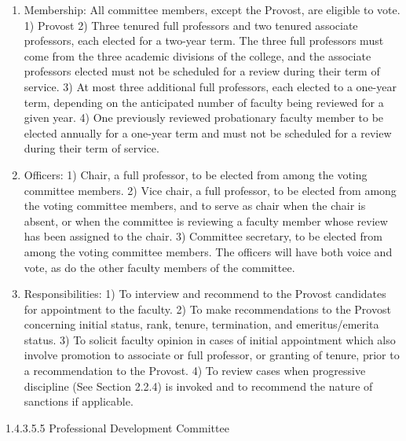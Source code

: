 \documentclass[letterpaper, 11pt]{article}
\begin{document}
				\begin{enumerate}[label=\alph*)]
					\item{Membership:}
					All committee members, except the Provost, are eligible to vote.
					1) Provost
					2) Three tenured full professors and two tenured associate professors, each elected for a two-year term.  The three full professors must come from the three academic divisions of the college, and the associate professors elected must not be scheduled for a review during their term of service.
					3) At most three additional full professors, each elected to a one-year term, depending on the anticipated number of faculty being reviewed for a given year.
					4) One previously reviewed probationary faculty member to be elected annually for a one-year term and must not be scheduled for a review during their term of service.
					\item{Officers:}
					1) Chair, a full professor, to be elected from among the voting committee members.
					2) Vice chair, a full professor, to be elected from among the voting committee members, and to serve as chair when the chair is absent, or when the committee is reviewing a faculty member whose review has been assigned to the chair.
					3) Committee secretary, to be elected from among the voting committee members.  The officers will have both voice and vote, as do the other faculty members of the committee.
					\item{Responsibilities:}
					1) To interview and recommend to the Provost candidates for appointment to the faculty.
					2) To make recommendations to the Provost concerning initial status, rank, tenure, termination, and emeritus/emerita status.
					3) To solicit faculty opinion in cases of initial appointment which also involve promotion to associate or full professor, or granting of tenure, prior to a recommendation to the Provost.
					4) To review cases when progressive discipline (See Section 2.2.4) is invoked and to recommend the nature of sanctions if applicable.
				\end{enumerate}
				1.4.3.5.5 Professional Development Committee
\end{document}
